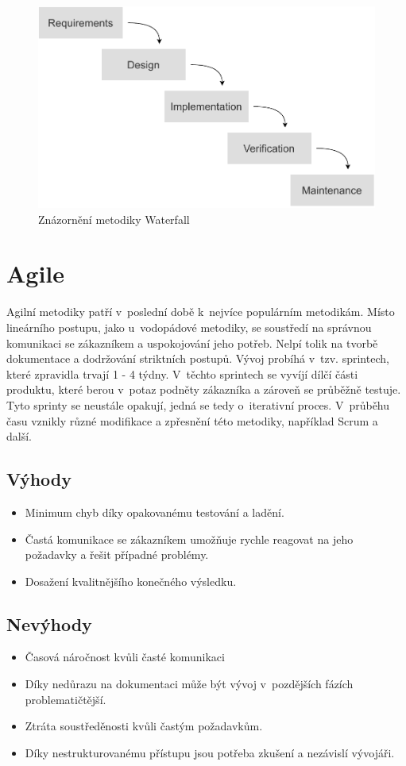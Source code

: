 \documentclass[thesis=M,czech]{FITthesis}[2019/12/23]
\begin{document}
\begin{figure}
	\centering
	\includegraphics[width=0.7\linewidth]{images/waterfall.pdf}
  	\caption{Znázornění metodiky Waterfall}
  	\label{dia:waterfall}
\end{figure}

\section{Agile \cite{agile}}
Agilní metodiky patří v~poslední době k~nejvíce populárním metodikám. Místo lineárního postupu, jako u~vodopádové metodiky, se soustředí na správnou komunikaci se zákazníkem a uspokojování jeho potřeb. Nelpí tolik na tvorbě dokumentace a dodržování striktních postupů. Vývoj probíhá v~tzv. sprintech, které zpravidla trvají 1 - 4 týdny. V~těchto sprintech se vyvíjí dílčí části produktu, které berou v~potaz podněty zákazníka a zároveň se průběžně testuje. Tyto sprinty se neustále opakují, jedná se tedy o~iterativní proces. V~průběhu času vznikly různé modifikace a zpřesnění této metodiky, například Scrum a další.

\subsection*{Výhody}
\begin{itemize}
    \item Minimum chyb díky opakovanému testování a ladění. 
    \item Častá komunikace se zákazníkem umožňuje rychle reagovat na jeho požadavky a řešit případné problémy.
    \item Dosažení kvalitnějšího konečného výsledku.
\end{itemize}

\subsection*{Nevýhody}
\begin{itemize}
    \item Časová náročnost kvůli časté komunikaci 
    \item Díky nedůrazu na dokumentaci může být vývoj v~pozdějších fázích problematičtější.
    \item Ztráta soustředěnosti kvůli častým požadavkům.
    \item Díky nestrukturovanému přístupu jsou potřeba zkušení a nezávislí vývojáři.
\end{itemize}
\end{document}

